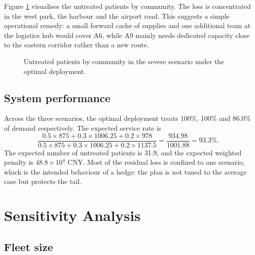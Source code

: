 \documentclass{apmcmthesis}
\begin{document}
Figure \ref{fig:unmet} visualises the untreated patients by community. The loss is concentrated in the west park, the harbour and the airport road. This suggests a simple operational remedy: a small forward cache of supplies and one additional team at the logistics hub would cover A6, while A9 mainly needs dedicated capacity close to the eastern corridor rather than a new route.

\begin{figure}[!ht]
\centering
{}
\caption{Untreated patients by community in the severe scenario under the optimal deployment.}
\label{fig:unmet}
\end{figure}

\subsection{System performance}

Across the three scenarios, the optimal deployment treats 100\%, 100\% and 86.0\% of demand respectively. The expected service rate is
\[
\frac{0.5\times875+0.3\times1006.25+0.2\times978}{0.5\times875+0.3\times1006.25+0.2\times1137.5}
=\frac{934.98}{1001.88}=93.3\%.
\]
The expected number of untreated patients is 31.9, and the expected weighted penalty is $48.8\times10^{4}$ CNY. Most of the residual loss is confined to one scenario, which is the intended behaviour of a hedge: the plan is not tuned to the average case but protects the tail.

\section{Sensitivity Analysis}

\subsection{Fleet size}
\end{document}
